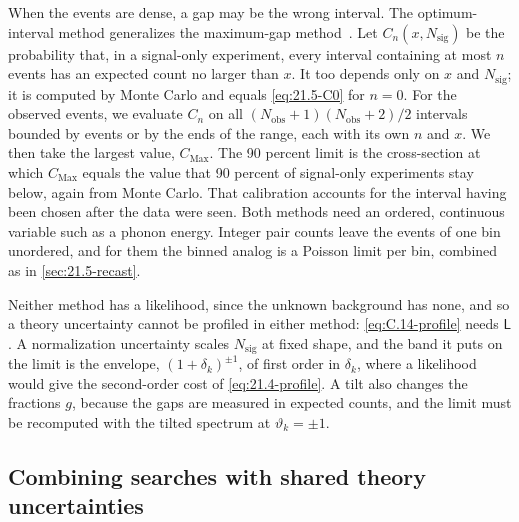When the events are dense, a gap may be the wrong interval. The optimum-interval method generalizes the maximum-gap method~\cite[Sect.~III]{yellin2002finding}. Let $C_n(x, N_{\mathrm{sig}})$ be the probability that, in a signal-only experiment, every interval containing at most $n$ events has an expected count no larger than $x$. It too depends only on $x$ and $N_{\mathrm{sig}}$; it is computed by Monte Carlo and equals \cref{eq:21.5-C0} for $n = 0$. For the observed events, we evaluate $C_n$ on all $(N_{\mathrm{obs}} + 1)(N_{\mathrm{obs}} + 2)/2$ intervals bounded by events or by the ends of the range, each with its own $n$ and $x$. We then take the largest value, $C_{\mathrm{Max}}$. The 90 percent limit is the cross-section at which $C_{\mathrm{Max}}$ equals the value that 90 percent of signal-only experiments stay below, again from Monte Carlo. That calibration accounts for the interval having been chosen after the data were seen. Both methods need an ordered, continuous variable such as a phonon energy. Integer pair counts leave the events of one bin unordered, and for them the binned analog is a Poisson limit per bin, combined as in \cref{sec:21.5-recast}.

Neither method has a likelihood, since the unknown background has none, and so a theory uncertainty cannot be profiled in either method: \cref{eq:C.14-profile} needs $\mathsf{L}$. A normalization uncertainty scales $N_{\mathrm{sig}}$ at fixed shape, and the band it puts on the limit is the envelope, $(1 + \delta_k)^{\pm1}$, of first order in $\delta_k$, where a likelihood would give the second-order cost of \cref{eq:21.4-profile}. A tilt also changes the fractions $g$, because the gaps are measured in expected counts, and the limit must be recomputed with the tilted spectrum at $\vartheta_k = \pm1$.

\subsection{Combining searches with shared theory uncertainties}\label{sec:21.5-combine}

